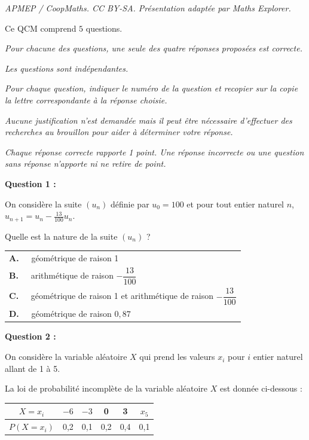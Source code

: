 \documentclass[10pt]{article}
\begin{document}
\noindent\textit{APMEP / CoopMaths. CC BY-SA. Présentation adaptée par Maths Explorer.}\par\medskip
\medskip

Ce QCM comprend $5$ questions.

\emph{Pour chacune des questions, une seule des quatre réponses proposées est correcte.}

\emph{Les questions sont indépendantes.}

\emph{Pour chaque question, indiquer le numéro de la question et recopier sur la copie la lettre correspondante à la réponse choisie.}

\emph{Aucune justification n’est demandée mais il peut être nécessaire d’effectuer des recherches au brouillon pour aider à déterminer votre réponse.}

\emph{Chaque réponse correcte rapporte 1 point. Une réponse incorrecte ou une question sans réponse n’apporte ni ne retire de point.}

\medskip
 \textbf{Question 1 :}
\medskip

 On considère la suite $\left(u_n\right)$ définie par $u_0=  100$ et pour tout entier naturel $n$, $u_{n+1}=u_n-\frac{13}{100}u_n$. 

Quelle est la nature de la suite $\left(u_n\right)$ ?


\begin{tabularx}{\linewidth}{*{1}{X}}
\textbf{A.~~} géométrique de raison 1\\
\textbf{B.~~} arithmétique de raison $-\dfrac{13}{100}$\\
\textbf{C.~~} géométrique de raison 1 et arithmétique de raison $-\dfrac{13}{100}$\\
\textbf{D.~~} géométrique de raison $0,87$\\
\end{tabularx}

\medskip
 \textbf{Question 2 :}
\medskip

On considère la variable aléatoire $X$ qui prend les valeurs $x_i$ pour $i$ entier naturel allant de 1 à 5.

La loi de probabilité incomplète de la variable aléatoire $X$ est donnée ci-dessous :

\begin{center}
\begin{tabular}[]{|*{6}{c|}}
\hline
$X = x_i$				&$- 6$	&$- 3$	&0	&3	&$x_5$\\\hline
$P\left(X = x_i\right)$	&0,2	&0,1	&0,2&0,4&0,1\\\hline
\end{tabular}
\end{center}
\end{document}

